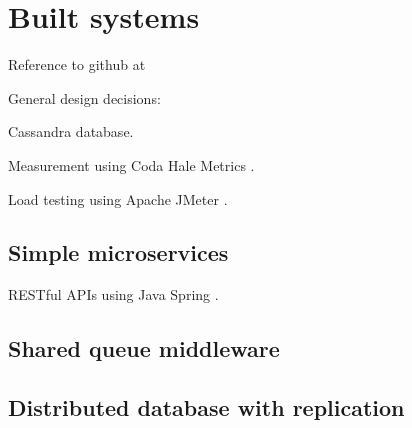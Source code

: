 %
%

\section{Built systems}

Reference to github at \cite{RN1073}

General design decisions:

Cassandra \cite{RN1050}\cite{RN1075} database.

Measurement using Coda Hale Metrics \cite{RN1079}.

Load testing using Apache JMeter \cite{RN1074}.

%
%
\subsection{Simple microservices}

RESTful APIs using Java Spring \cite{RN1076}.

%
%
\subsection{Shared queue middleware}

%
%
\subsection{Distributed database with replication}

